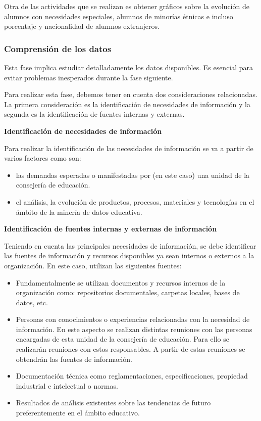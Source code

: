 Otra de las actividades que se realizan es obtener gráficos sobre la evolución de alumnos con necesidades especiales, alumnos de minorías étnicas e incluso porcentaje y nacionalidad de alumnos extranjeros.

\subsubsection{Comprensión de los datos}
Esta fase implica estudiar detalladamente los datos disponibles. Es esencial para evitar problemas inesperados durante la fase siguiente.

Para realizar esta fase, debemos tener en cuenta dos consideraciones relacionadas. La primera consideración es la identificación de necesidades de información y la segunda es la identificación de fuentes internas y externas.

\textbf{Identificación de necesidades de información}

Para realizar la identificación de las necesidades de información se va a partir de varios factores como son:
\begin{itemize}
	\item las demandas esperadas o manifestadas por (en este caso) una unidad de la consejería de educación.
	\item el análisis, la evolución de productos, procesos, materiales y tecnologías en el ámbito de la minería de datos educativa.
\end{itemize}

\textbf{Identificación de fuentes internas y externas de información}

Teniendo en cuenta las principales necesidades de información, se debe identificar las fuentes de información y recursos disponibles ya sean internos o externos a la organización. En este caso, utilizan las siguientes fuentes:
\begin{itemize}
	\item Fundamentalmente se utilizan documentos y recursos internos de la organización como: repositorios documentales, carpetas locales, bases de datos, etc.
	\item Personas con conocimientos o experiencias relacionadas con la necesidad de información. En este aspecto se realizan distintas reuniones con las personas encargadas de esta unidad de la consejería de educación. Para ello se realizarán reuniones con estos responsables. A partir de estas reuniones se obtendrán las fuentes de información.
	\item Documentación técnica como reglamentaciones, especificaciones, propiedad industrial e intelectual o normas.
	\item Resultados de análisis existentes sobre las tendencias de futuro preferentemente en el ámbito educativo.
\end{itemize}

